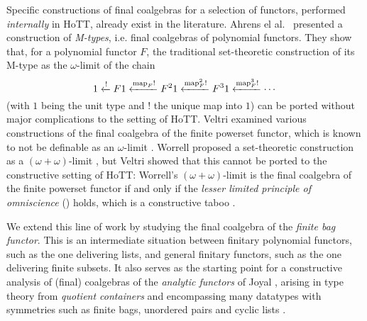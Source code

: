 \documentclass[a4paper,USenglish,cleveref]{lipics-v2021}
\begin{document}
Specific constructions of final coalgebras for a selection of functors, performed \emph{internally} in HoTT, already exist in the literature. Ahrens el al.~\cite{Ahrens2015} presented a construction of \emph{M-types}, i.e. final coalgebras of polynomial functors. They show that, for a polynomial functor $F$, the traditional set-theoretic construction of its M-type as the $\omega$-limit of the chain
\begin{equation}\label{eq:chain}
    1 \xleftarrow{!} {F 1}
      \xleftarrow{\Map{F} !} {F^2 1}
      \xleftarrow{\Map{F}^2 !} {F^3 1}
      \xleftarrow{\Map{F}^3 !}
      \cdots
\end{equation}
(with $1$ being the unit type and $!$ the unique map into $1$) can be ported without major complications to the setting of HoTT. Veltri \cite{Veltri2021} examined various constructions of the final coalgebra of the finite powerset functor, which is known to not be definable as an $\omega$-limit \cite{Adamek1995}. Worrell proposed a set-theoretic construction as a $(\omega+\omega)$-limit \cite{Worrell2005}, but Veltri showed that this cannot be ported to the constructive setting of HoTT: Worrell's $(\omega+\omega)$-limit is the final coalgebra of the finite powerset functor if and only if the \emph{lesser limited principle of omniscience} (\LLPO{}) holds, which is a constructive taboo \cite{Bridges1987}.


We extend this line of work by studying the final coalgebra of the \emph{finite bag functor}. This is an intermediate situation between finitary polynomial functors, such as the one delivering lists, and general finitary functors, such as the one delivering finite subsets. It also serves as the starting point for a constructive analysis of (final) coalgebras of the \emph{analytic functors} of Joyal \cite{Joyal1986}, arising in type theory from \emph{quotient containers} \cite{Abbott2004} and encompassing many datatypes with symmetries such as finite bags, unordered pairs and cyclic lists \cite{Yorgey2010,Yorgey2014}.
\end{document}
